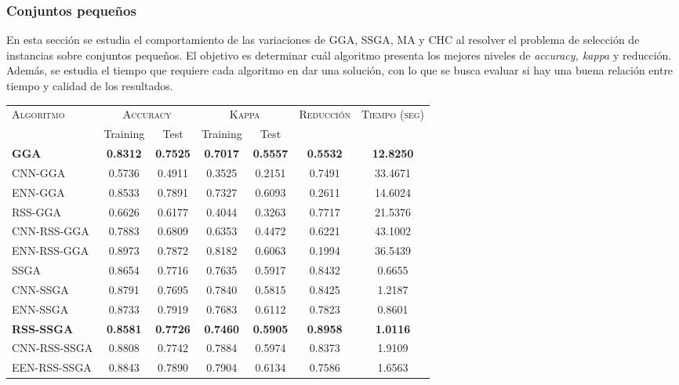 \subsubsection{Conjuntos pequeños}

En esta sección se estudia el comportamiento de las variaciones de GGA, SSGA, MA y CHC al resolver el problema de selección de instancias sobre conjuntos pequeños. El objetivo es determinar cuál algoritmo presenta los mejores niveles de \emph{accuracy, kappa} y reducción. Además, se estudia el tiempo que requiere cada algoritmo en dar una solución, con lo que se busca evaluar si hay una buena relación entre tiempo y calidad de los resultados.


\begin{table}[h!]
\centering
\begin{tabular}{l c c c c c c}
\hline
\multirow{2}{*}{\textsc{Algoritmo}}
	& \multicolumn{2}{c}{\textsc{Accuracy}}
	& \multicolumn{2}{c}{\textsc{Kappa}}
	& \textsc{Reducción}
	& \textsc{Tiempo (seg)} \\
	& Training & Test
	& Training & Test \\ 
\hline
\hline

\textbf{GGA}         & \textbf{0.8312} & \textbf{0.7525} & \textbf{0.7017} & \textbf{0.5557} & \textbf{0.5532} & \textbf{12.8250} \\
CNN-GGA     & 0.5736 & 0.4911 & 0.3525 & 0.2151 & 0.7491 & 33.4671 \\
ENN-GGA     & 0.8533 & 0.7891 & 0.7327 & 0.6093 & 0.2611 & 14.6024 \\
RSS-GGA     & 0.6626 & 0.6177 & 0.4044 & 0.3263 & 0.7717 & 21.5376 \\
CNN-RSS-GGA & 0.7883 & 0.6809 & 0.6353 & 0.4472 & 0.6221 & 43.1002 \\
ENN-RSS-GGA & 0.8973 & 0.7872 & 0.8182 & 0.6063 & 0.1994 & 36.5439 \\

\hline

SSGA & 0.8654 & 0.7716 & 0.7635 & 0.5917 & 0.8432 & 0.6655 \\
CNN-SSGA & 0.8791 & 0.7695 & 0.7840 & 0.5815 & 0.8425 & 1.2187 \\
ENN-SSGA & 0.8733 & 0.7919 & 0.7683 & 0.6112 & 0.7823 & 0.8601 \\
\textbf{RSS-SSGA} & \textbf{0.8581} & \textbf{0.7726} & \textbf{0.7460} & \textbf{0.5905} & \textbf{0.8958} &\textbf{1.0116} \\
CNN-RSS-SSGA & 0.8808 & 0.7742 & 0.7884 & 0.5974 & 0.8373 & 1.9109 \\
EEN-RSS-SSGA & 0.8843 & 0.7890 & 0.7904 & 0.6134 & 0.7586 & 1.6563 \\


\end{tabular}
\end{table}
